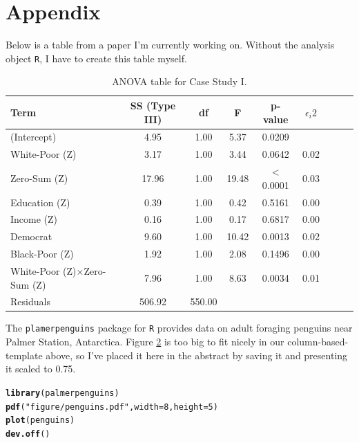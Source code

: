 \documentclass{article}\usepackage[]{graphicx}\usepackage[]{xcolor}
\makeatletter
\newcommand{\hlnum}[1]{\textcolor[rgb]{0.686,0.059,0.569}{#1}}%
\newcommand{\hlsng}[1]{\textcolor[rgb]{0.192,0.494,0.8}{#1}}%
\newcommand{\hldef}[1]{\textcolor[rgb]{0.345,0.345,0.345}{#1}}%
\newcommand{\hlkwc}[1]{\textcolor[rgb]{0.333,0.667,0.333}{#1}}%
\newcommand{\hlkwd}[1]{\textcolor[rgb]{0.737,0.353,0.396}{\textbf{#1}}}%
\newenvironment{kframe}{%
 \def\at@end@of@kframe{}%
 \ifinner\ifhmode%
  \def\at@end@of@kframe{\end{minipage}}%
  \begin{minipage}{\columnwidth}%
 \fi\fi%
 \def\FrameCommand##1{\hskip\@totalleftmargin \hskip-\fboxsep
 \colorbox{shadecolor}{##1}\hskip-\fboxsep
     \hskip-\linewidth \hskip-\@totalleftmargin \hskip\columnwidth}%
 \MakeFramed {\advance\hsize-\width
   \@totalleftmargin\z@ \linewidth\hsize
   \@setminipage}}%
 {\par\unskip\endMakeFramed%
 \at@end@of@kframe}
\newenvironment{knitrout}{}{} %
\makeatother
\begin{document}
\pagebreak{}

\section{Appendix}
Below is a table from a paper I'm currently working on. Without the analysis object \texttt{R}, I have to create this table myself.

\begin{table}[H]
\begin{center}
\begin{tabular}{ l  cc  cc  cc  cc |}\\\hline
Term & SS (Type III) & df & F & p-value & $\epsilon_i {2}$ \\\hline
(Intercept) &4.95 &1.00 &5.37 &0.0209 \\
White-Poor (Z) &3.17 &1.00 &3.44 &0.0642 &0.02 \\
Zero-Sum (Z) &17.96 &1.00 &19.48 &< 0.0001 &0.03 \\
Education (Z) &0.39 &1.00 &0.42 &0.5161 &0.00 \\
Income (Z) &0.16 &1.00 &0.17 &0.6817 &0.00 \\
Democrat &9.60 &1.00 &10.42 &0.0013 &0.02 \\
Black-Poor (Z) &1.92 &1.00 &2.08 &0.1496 &0.00 \\
White-Poor (Z)×Zero-Sum (Z) &7.96 &1.00 &8.63 &0.0034 &0.01 \\
Residuals &506.92 &550.00 \\\hline
\end{tabular} \label{full.sleep.tab}
\caption{ANOVA table for Case Study I.}
\end{center}
\end{table}

The \texttt{plamerpenguins} package for \texttt{R} \citep{palmerP} provides data on adult foraging penguins near Palmer Station, Antarctica. Figure \hyperref[plot2]{2} is too big to fit nicely in our column-based-template above, so I've placed it here in the abstract by saving it and presenting it scaled to 0.75.

\begin{knitrout}\scriptsize
{}\color{fgcolor}\begin{kframe}
\begin{alltt}
\hlkwd{library}\hldef{(palmerpenguins)}
\hlkwd{pdf}\hldef{(}\hlsng{"figure/penguins.pdf"}\hldef{,} \hlkwc{width} \hldef{=} \hlnum{8}\hldef{,} \hlkwc{height} \hldef{=} \hlnum{5}\hldef{)}
\hlkwd{plot}\hldef{(penguins)}
\hlkwd{dev.off}\hldef{()}
\end{alltt}
\end{kframe}
\end{knitrout}
\end{document}

